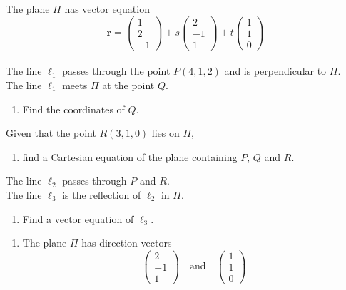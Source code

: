 \documentclass[leqno]{article}
\begin{document}
\begin{enumerate}[
  label=\textbf{\arabic*.},
  leftmargin=*,
  topsep=0pt,
  partopsep=0pt,
  parsep=0pt
]
The plane $\Pi$ has vector equation
\[
\mathbf{r}=\begin{pmatrix}1\\2\\-1\end{pmatrix}+s\begin{pmatrix}2\\-1\\1\end{pmatrix}+t\begin{pmatrix}1\\1\\0\end{pmatrix}
\] \\
The line $\ell_1$ passes through the point $P(4,1,2)$ and is perpendicular to $\Pi$. \\
The line $\ell_1$ meets $\Pi$ at the point $Q$. \\
\begin{enumerate}[label=\textbf{(\alph*)}]
  \item Find the coordinates of $Q$.  \\
\end{enumerate}
Given that the point $R(3,1,0)$ lies on $\Pi$, \\
\begin{enumerate}[label=\textbf{(\alph*)}, resume]
  \item find a Cartesian equation of the plane containing $P$, $Q$ and $R$.  \\
\end{enumerate}
The line $\ell_2$ passes through $P$ and $R$. \\
The line $\ell_3$ is the reflection of $\ell_2$ in $\Pi$. \\
\begin{enumerate}[label=\textbf{(\alph*)}, resume]
  \item Find a vector equation of $\ell_3$.  \\
\end{enumerate}

\vspace*{10pt}

\begin{djsSolution}
\begin{enumerate}[label=\textbf{(\alph*)}]
  \item The plane \(\Pi\) has direction vectors
\[
\begin{pmatrix}2\\-1\\1\end{pmatrix}
\quad \text{and} \quad
\begin{pmatrix}1\\1\\0\end{pmatrix}
\]


\end{enumerate}
\end{djsSolution}
\end{enumerate}
\end{document}
